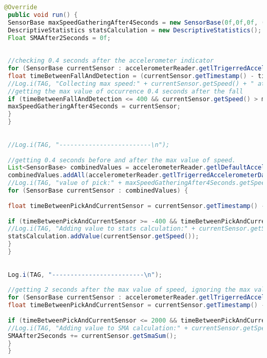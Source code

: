 \begin{lstlisting}[caption=Algoritmo de Detecção de Quedas em Java, label=cod:java, language=JAVA, frame=single, breaklines=true]
 @Override
 public void run() {
 SensorBase maxSpeedGatheringAfter4Seconds = new SensorBase(0f,0f,0f, (long) 0);
 DescriptiveStatistics statsCalculation = new DescriptiveStatistics();
 Float SMAAfter2Seconds = 0f;
 
 
 //checking 0.4 seconds after the accelerometer indicator
 for (SensorBase currentSensor : accelerometerReader.getlTrigerredAccelerometerData()) {
 float timeBetweenFallAndDetection = (currentSensor.getTimestamp() - timeOfOcurrence);
 //Log.i(TAG, "Collecting max speed:" + currentSensor.getSpeed() + " at " + currentSensor.getDate() + " on " + currentSensor.getTimestamp() );
 //getting the max value of occurrence 0.4 seconds after the fall
 if (timeBetweenFallAndDetection <= 400 && currentSensor.getSpeed() > maxSpeedGatheringAfter4Seconds.getSpeed()) {
 maxSpeedGatheringAfter4Seconds = currentSensor;
 }
 }
 
 
 //Log.i(TAG, "-------------------------\n");
 
 //getting 0.4 seconds before and after the max value of speed.
 List<SensorBase> combinedValues = accelerometerReader.getlDefaultAccelerometerData();
 combinedValues.addAll(accelerometerReader.getlTrigerredAccelerometerData());
 //Log.i(TAG, "value of pick:" + maxSpeedGatheringAfter4Seconds.getSpeed()/gravity + " at " + maxSpeedGatheringAfter4Seconds.getDate() + " on " + maxSpeedGatheringAfter4Seconds.getTimestamp());
 for (SensorBase currentSensor : combinedValues) {
 
 float timeBetweenPickAndCurrentSensor = currentSensor.getTimestamp() - maxSpeedGatheringAfter4Seconds.getTimestamp();
 
 if (timeBetweenPickAndCurrentSensor >= -400 && timeBetweenPickAndCurrentSensor <= 400) {
 //Log.i(TAG, "Adding value to stats calculation:" + currentSensor.getSpeed() + " at " + currentSensor.getDate() + " on " + currentSensor.getTimestamp() );
 statsCalculation.addValue(currentSensor.getSpeed());
 }
 }
 
 
 Log.i(TAG, "-------------------------\n");
 
 //getting 2 seconds after the max value of speed, ignoring the max value
 for (SensorBase currentSensor : accelerometerReader.getlTrigerredAccelerometerData()) {
 float timeBetweenPickAndCurrentSensor = currentSensor.getTimestamp() - maxSpeedGatheringAfter4Seconds.getTimestamp();
 
 if (timeBetweenPickAndCurrentSensor <= 2000 && timeBetweenPickAndCurrentSensor > 0) {
 //Log.i(TAG, "Adding value to SMA calculation:" + currentSensor.getSpeed() + " at " + currentSensor.getDate() + " on " + currentSensor.getTimestamp() );
 SMAAfter2Seconds += currentSensor.getSmaSum();
 }
 }
 

\end{lstlisting}
